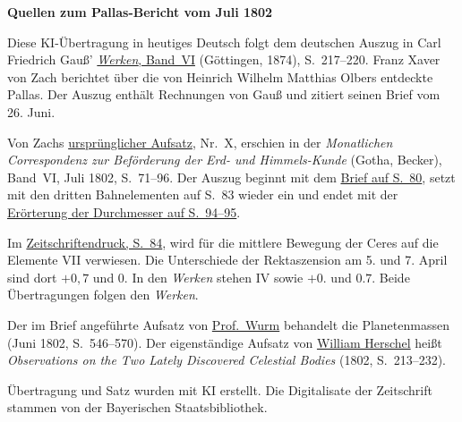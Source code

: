 \clearpage\thispagestyle{empty}
\begin{center}\textbf{Quellen zum Pallas-Bericht vom Juli 1802}\end{center}
\noindent Diese KI-Übertragung in heutiges Deutsch folgt dem deutschen Auszug in Carl Friedrich Gauß’ \href{https://gdz.sub.uni-goettingen.de/id/PPN236007467}{\textit{Werken}, Band~VI} (Göttingen, 1874), S.~217--220. Franz Xaver von Zach berichtet über die von Heinrich Wilhelm Matthias Olbers entdeckte Pallas. Der Auszug enthält Rechnungen von Gauß und zitiert seinen Brief vom 26. Juni.
\par\smallskip\noindent Von Zachs \href{https://api.digitale-sammlungen.de/iiif/image/v2/bsb10538598_00077/full/1450,/0/default.jpg}{ursprünglicher Aufsatz}, Nr.~X, erschien in der \textit{Monatlichen Correspondenz zur Beförderung der Erd- und Himmels-Kunde} (Gotha, Becker), Band~VI, Juli 1802, S.~71--96. Der Auszug beginnt mit dem \href{https://api.digitale-sammlungen.de/iiif/image/v2/bsb10538598_00086/full/1450,/0/default.jpg}{Brief auf S.~80}, setzt mit den dritten Bahnelementen auf S.~83 wieder ein und endet mit der \href{https://api.digitale-sammlungen.de/iiif/image/v2/bsb10538598_00100/full/1450,/0/default.jpg}{Erörterung der Durchmesser auf S.~94--95}.
\par\smallskip\noindent Im \href{https://api.digitale-sammlungen.de/iiif/image/v2/bsb10538598_00090/full/1450,/0/default.jpg}{Zeitschriftendruck, S.~84}, wird für die mittlere Bewegung der Ceres auf die Elemente VII verwiesen. Die Unterschiede der Rektaszension am 5. und 7. April sind dort \(+0{,}7\) und \(0\). In den \textit{Werken} stehen IV sowie \(+0.\) und \(0.7\). Beide Übertragungen folgen den \textit{Werken}.
\par\smallskip\noindent Der im Brief angeführte Aufsatz von \href{https://api.digitale-sammlungen.de/iiif/image/v2/bsb10538597_00562/full/1450,/0/default.jpg}{Prof.\ Wurm} behandelt die Planetenmassen (Juni 1802, S.~546--570). Der eigenständige Aufsatz von \href{https://doi.org/10.1098/rstl.1802.0010}{William Herschel} heißt \textit{Observations on the Two Lately Discovered Celestial Bodies} (1802, S.~213--232).
\par\smallskip\noindent Übertragung und Satz wurden mit KI erstellt. Die Digitalisate der Zeitschrift stammen von der Bayerischen Staatsbibliothek.
\clearpage
